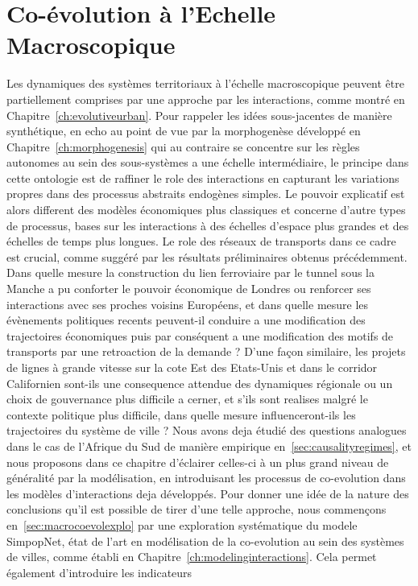 
\chapter{Co-évolution à l'Echelle Macroscopique}


\label{ch:macrocoevolution} 




Les dynamiques des systèmes territoriaux à l'échelle macroscopique peuvent être partiellement comprises par une approche par les interactions, comme montré en Chapitre~\ref{ch:evolutiveurban}. Pour rappeler les idées sous-jacentes de manière synthétique, en echo au point de vue par la morphogenèse développé en Chapitre~\ref{ch:morphogenesis} qui au contraire se concentre sur les règles autonomes au sein des sous-systèmes a une échelle intermédiaire, le principe dans cette ontologie est de raffiner le role des interactions en capturant les variations propres dans des processus abstraits endogènes simples. Le pouvoir explicatif est alors different des modèles économiques plus classiques et concerne d'autre types de processus, bases sur les interactions à des échelles d'espace plus grandes et des échelles de temps plus longues. Le role des réseaux de transports dans ce cadre est crucial, comme suggéré par les résultats préliminaires obtenus précédemment. Dans quelle mesure la construction du lien ferroviaire par le tunnel sous la Manche a pu conforter le pouvoir économique de Londres ou renforcer ses interactions avec ses proches voisins Européens, et dans quelle mesure les évènements politiques recents peuvent-il conduire a une modification des trajectoires économiques puis par conséquent a une modification des motifs de transports par une retroaction de la demande ? D'une façon similaire, les projets de lignes à grande vitesse sur la cote Est des Etats-Unis et dans le corridor Californien sont-ils une consequence attendue des dynamiques régionale ou un choix de gouvernance plus difficile a cerner, et s'ils sont realises malgré le contexte politique plus difficile, dans quelle mesure influenceront-ils les trajectoires du système de ville ? Nous avons deja étudié des questions analogues dans le cas de l'Afrique du Sud de manière empirique en~\ref{sec:causalityregimes}, et nous proposons dans ce chapitre d'éclairer celles-ci à un plus grand niveau de généralité par la modélisation, en introduisant les processus de co-evolution dans les modèles d'interactions deja développés. Pour donner une idée de la nature des conclusions qu'il est possible de tirer d'une telle approche, nous commençons en~\ref{sec:macrocoevolexplo} par une exploration systématique du modele SimpopNet, état de l'art en modélisation de la co-evolution au sein des systèmes de villes, comme établi en Chapitre~\ref{ch:modelinginteractions}. Cela permet également d'introduire les indicateurs 